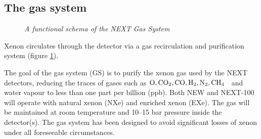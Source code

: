 \subsection*{The gas system}



\begin{figure}[hpt!]
    \bigskip
    \begin{center}\leavevmode
        \caption{\textit{A functional schema of the NEXT Gas System}}
        \label{fig:F8:F8}
    \end{center}
\end{figure}

Xenon circulates through the detector via a gas recirculation and purification system (figure \ref{fig:F8:F8}).


The goal of the gas system (GS) is to purify the xenon gas used by the NEXT detectors, reducing the traces of gases such as ${\rm O, CO_2,CO, H_2, N_2, CH_4}$~ and water vapour to less than one part per billion (ppb). Both NEW and NEXT-100 will operate with natural xenon (NXe) and enriched xenon (EXe). The gas will be maintained at room temperature and 10--15 bar pressure inside the detector(s). The gas system has been designed to avoid significant losses of xenon under all foreseeable circumstances.

